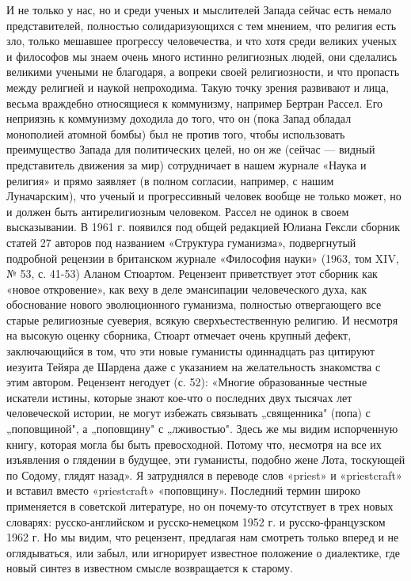 И не только у нас, но и среди ученых и мыслителей Запада сейчас есть немало
представителей, полностью солидаризующихся с тем мнением, что религия есть зло,
только мешавшее прогрессу человечества, и что хотя среди великих ученых и
философов мы знаем очень много истинно религиозных людей, они сделались
великими учеными не благодаря, а вопреки своей религиозности, и что пропасть
между религией и наукой непроходима. Такую точку зрения развивают и лица,
весьма враждебно относящиеся к коммунизму, например Бертран Рассел. Его
неприязнь к коммунизму доходила до того, что он (пока Запад обладал монополией
атомной бомбы) был не против того, чтобы использовать преимущество Запада для
политических целей, но он же (сейчас --- видный представитель движения за мир)
сотрудничает в нашем журнале «Наука и религия» и прямо заявляет (в полном
согласии, например, с нашим Луначарским), что ученый и прогрессивный человек
вообще не только может, но и должен быть антирелигиозным человеком. Рассел не
одинок в своем высказывании. В 1961 г. появился под общей редакцией Юлиана
Гексли сборник статей 27 авторов под названием «Структура гуманизма»,
подвергнутый подробной рецензии в британском журнале «Философия науки» (1963,
том XIV, № 53, с. 41-53) Аланом Стюартом. Рецензент приветствует этот сборник
как «новое откровение», как веху в деле эмансипации человеческого духа, как
обоснование нового эволюционного гуманизма, полностью отвергающего все старые
религиозные суеверия, всякую сверхъестественную религию. И несмотря на высокую
оценку сборника, Стюарт отмечает очень крупный дефект, заключающийся в том, что
эти новые гуманисты одиннадцать раз цитируют иезуита Тейяра де Шардена даже с
указанием на желательность знакомства с этим автором. Рецензент негодует (с.
52): «Многие образованные честные искатели истины, которые знают кое-что о
последних двух тысячах лет человеческой истории, не могут избежать связывать
„священника" (попа) с „поповщиной", а „поповщину" с „лживостью". Здесь же мы
видим испорченную книгу, которая могла бы быть превосходной. Потому что,
несмотря на все их изъявления о глядении в будущее, эти гуманисты, подобно жене
Лота, тоскующей по Содому, глядят назад». Я затруднялся в переводе слов
«priest» и «priestcraft» и вставил вместо «priestcraft» «поповщину». Последний
термин широко применяется в советской литературе, но он почему-то отсутствует в
трех новых словарях: русско-английском и русско-немецком 1952 г. и
русско-французском 1962 г. Но мы видим, что рецензент, предлагая нам смотреть
только вперед и не оглядываться, или забыл, или игнорирует известное положение
о диалектике, где новый синтез в известном смысле возвращается к старому.

